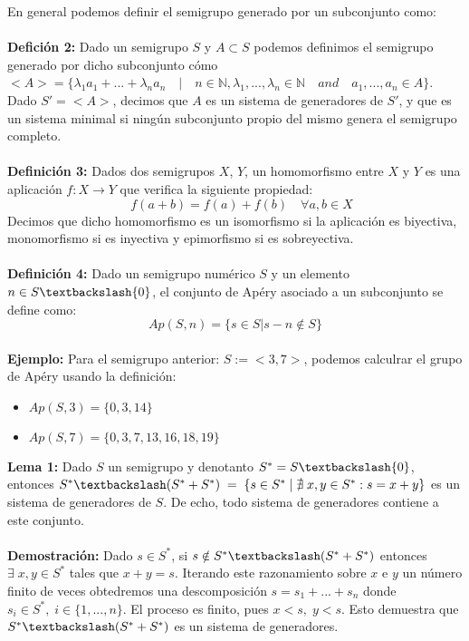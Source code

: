 \documentclass[10pt,spanish]{book}
\begin{document}
En general podemos definir el semigrupo generado por un subconjunto como:\\
\\ \textbf{Defición 2:} Dado un semigrupo $S$ y $A\subset S$ podemos definimos el semigrupo generado por dicho subconjunto cómo $<A>=\{\lambda_{1}a_{1}+...+\lambda_{n}a_{n}\quad |\quad n\in\mathbb{N}, \lambda_{1},...,\lambda_{n}\in\mathbb{N}\quad and\quad a_{1},...,a_{n}\in A\}$. Dado $S'=<A>$, decimos que $A$ es un sistema de generadores de $S'$, y que es un sistema minimal si ningún subconjunto propio del mismo genera el semigrupo completo. \\
\\ \textbf{Definición 3:} Dados dos semigrupos $X$, $Y$, un homomorfismo entre $X$ y $Y$ es una aplicación $f:X\rightarrow Y$ que verifica la siguiente propiedad:\\
$$\quad f(a+b)=f(a)+f(b)\quad \forall a, b\in X$$ 
Decimos que dicho homomorfismo es un isomorfismo si la aplicación es biyectiva, monomorfismo si es inyectiva y epimorfismo si es sobreyectiva.\\
\\ \textbf{Definición 4:} Dado un semigrupo numérico $S$ y un elemento $n\in S\textbackslash\{0\}$, el conjunto de Apéry asociado a un subconjunto se define como:
$$ Ap(S,n) = \{s\in S | s-n\notin S\} $$\\
\textbf{Ejemplo: } Para el semigrupo anterior: $S:=<{3,7}>$, podemos calculrar el grupo de Apéry usando la definición:
\begin{itemize}
\item $Ap(S,3)=\{0,3,14\}$
\item $Ap(S,7)=\{0,3,7,13,16,18,19\}$
\end{itemize}
\textbf{Lema 1: } Dado $S$ un semigrupo y denotanto $S^{*}=S\textbackslash \{0\}$, entonces $S^{*}\textbackslash (S^{*}+S^{*}) \;=\; \{s\in S^{*} \; |\; \nexists\; x,y\in S^{*} : s=x+y\}$ es un sistema de generadores de $S$. De echo, todo sistema de generadores contiene a este conjunto.\\
\\ \textbf{Demostración:} Dado $s\in S^{*}$, si $s\notin S^{*}\textbackslash (S^{*}+S^{*})$ entonces $\exists \; x,y\in S^{*}$ tales que $x+y=s$. Iterando este razonamiento sobre $x$ e $y$ un número finito de veces obtedremos una descomposición $s=s_{1}+...+s_{n}$ donde $s_{i}\in S^{*},\; i\in \{1,...,n\}$. El proceso es finito, pues $x<s,\; y<s$. Esto demuestra que $S^{*}\textbackslash (S^{*}+S^{*})$ es un sistema de generadores.\\
\end{document}
